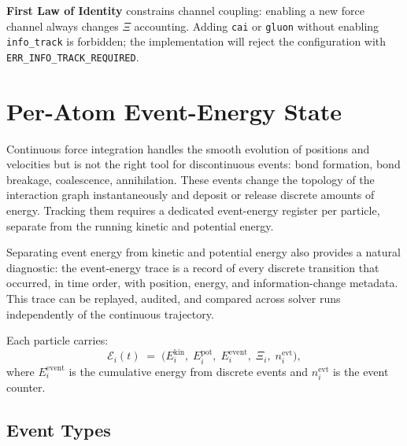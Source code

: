 \documentclass[11pt,a4paper]{article}
\newcommand{\Rec}{\Xi}
\begin{document}
\begin{smlaw}
\textbf{First Law of Identity} constrains channel coupling: enabling a new
force channel always changes $\Rec$ accounting.  Adding \texttt{cai} or
\texttt{gluon} without enabling \texttt{info\_track} is forbidden; the
implementation will reject the configuration with
\texttt{ERR\_INFO\_TRACK\_REQUIRED}.
\end{smlaw}

\section{Per-Atom Event-Energy State}\label{sec:event}

Continuous force integration handles the smooth evolution of positions and
velocities but is not the right tool for discontinuous events: bond formation,
bond breakage, coalescence, annihilation.  These events change the topology
of the interaction graph instantaneously and deposit or release discrete
amounts of energy.  Tracking them requires a dedicated event-energy register
per particle, separate from the running kinetic and potential energy.

Separating event energy from kinetic and potential energy also provides a
natural diagnostic: the event-energy trace is a record of every discrete
transition that occurred, in time order, with position, energy, and
information-change metadata.  This trace can be replayed, audited, and
compared across solver runs independently of the continuous trajectory.

Each particle carries:
\[
  \mathcal{E}_i(t) \;=\;
  \bigl(
    E_i^{\mathrm{kin}},\;
    E_i^{\mathrm{pot}},\;
    E_i^{\mathrm{event}},\;
    \Rec_i,\;
    n_i^{\mathrm{evt}}
  \bigr) ,
\]
where $E_i^{\mathrm{event}}$ is the cumulative energy from discrete events and
$n_i^{\mathrm{evt}}$ is the event counter.

\subsection{Event Types}
\end{document}
